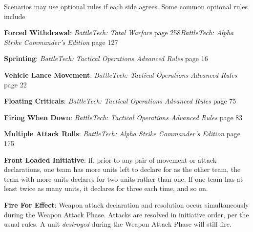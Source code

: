 Scenarios may use optional rules if each side agrees.
Some common optional rules include

\begin{description}

\item {\bfseries Forced Withdrawal}: \emph{BattleTech: Total Warfare} page 258\emph{BattleTech: Alpha Strike Commander's Edition} page 127

\item {\bfseries Sprinting}: \emph{BattleTech: Tactical Operations Advanced Rules} page 16

\item {\bfseries Vehicle Lance Movement}: \emph{BattleTech: Tactical Operations Advanced Rules} page 22

\item {\bfseries Floating Criticals}: \emph{BattleTech: Tactical Operations Advanced Rules} page 75

\item {\bfseries Firing When Down}: \emph{BattleTech: Tactical Operations Advanced Rules} page 83

\item {\bfseries Multiple Attack Rolls}: \emph{BattleTech: Alpha Strike Commander's Edition} page 175

\item {\bfseries Front Loaded Initiative}: If, prior to any pair of movement or attack declarations, one team has more units left to declare for as the other team, the team with more units declares for two units rather than one.
If one team has at least twice as many units, it declares for three each time, and so on.

\item {\bfseries Fire For Effect}: Weapon attack declaration and resolution occur simultaneously during the Weapon Attack Phase.
Attacks are resolved in initiative order, per the usual rules.
A unit \emph{destroyed} during the Weapon Attack Phase will still fire.

\end{description}
